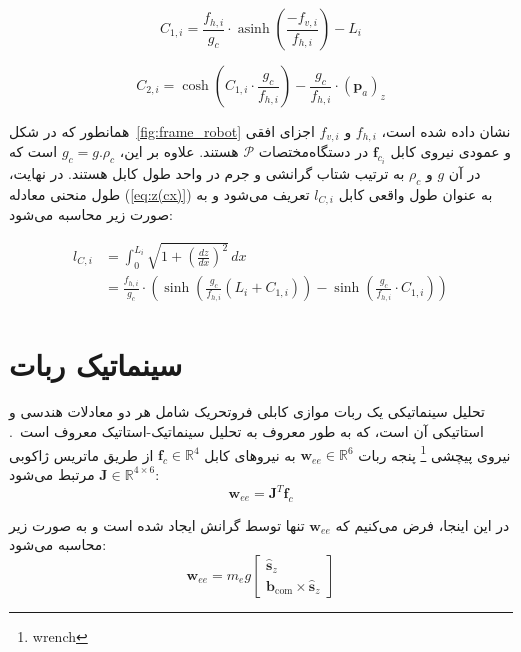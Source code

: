 \begin{equation}  \label{eq:C1}
	C_{1,i} = \frac{f_{h,i}}{g_c} \cdot \operatorname{asinh} \left( \frac{-f_{v,i}}{f_{h,i}} \right) - L_i  
\end{equation}

\begin{equation}  \label{eq:C2}
	C_{2,i} = \cosh \left(C_{1,i} \cdot \frac{g_c}{f_{h,i}} \right) - \frac{g_c}{f_{h,i}} \cdot (\bm{p}_a)_z
\end{equation}

همانطور که در شکل~\ref{fig:frame_robot} نشان داده شده است، $f_{h,i}$ و $f_{v,i}$ اجزای افقی و عمودی نیروی کابل $\mathbf{f}_{c_i}$ در دستگاه‌مختصات $\mathcal{P}$ هستند. علاوه بر این، $g_c=g.\rho_c$ است که در آن $g$ و $\rho_c$ به ترتیب شتاب گرانشی و جرم در واحد طول کابل هستند. در نهایت، طول منحنی معادله (\ref{eq:z(cx)}) به عنوان طول واقعی کابل $l_{C,i}$ تعریف می‌شود و به صورت زیر محاسبه می‌شود:

\begin{equation}  \label{eq:lcat}
	\begin{aligned}
		l_{C,i} &= \int_0^{L_i} \sqrt{1 + \left(\frac{dz}{dx}\right)^2} \, dx \\ &= \frac{f_{h,i}}{g_c} \cdot \left( \sinh \left( \frac{g_c}{f_{h,i}} (L_i + C_{1,i}) \right) - \sinh \left( \frac{g_c}{f_{h,i}} \cdot C_{1,i} \right) \right) 
	\end{aligned}
\end{equation}


\section{سینماتیک ربات}   
تحلیل سینماتیکی یک ربات موازی کابلی فروتحریک شامل هر دو معادلات هندسی و استاتیکی آن است، که به طور معروف به تحلیل سینماتیک-استاتیک معروف است~\cite{carricato2013direct}. نیروی پیچشی
\footnote{wrench}
 پنجه ربات
 $\mathbf{w}_{ee} \in \mathbb{R}^6$ 
به نیروهای کابل $\mathbf{f}_c \in \mathbb{R}^4 $ از طریق ماتریس ژاکوبی $\bm{J} \in \mathbb{R}^{4\times6}$ مرتبط می‌شود:
\begin{equation} \label{eq:static}
	\mathbf{w}_{ee} = \bm{J}^T \mathbf{f}_{c}  
\end{equation}


در این اینجا، فرض می‌کنیم که $\mathbf{w}_{ee}$ تنها توسط گرانش ایجاد شده است و به صورت زیر محاسبه می‌شود:
\begin{equation} \label{eq:example}
	\mathbf{w}_{ee} = m_{e}g \begin{bmatrix} \hat{\bm{s}}_z \\ \bm{b}_{\text{com}} \times \hat{\bm{s}}_z \end{bmatrix}
\end{equation}

